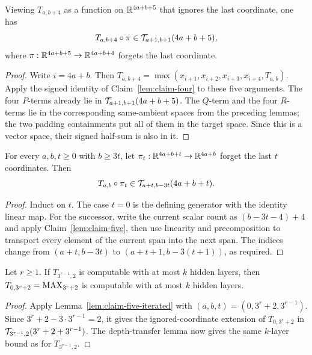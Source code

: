 \begin{lemma}
  \label{lem:claim-five}
  Viewing $T_{a,b+4}$ as a function on $\mathbb{R}^{4a+b+5}$ that ignores the last
  coordinate, one has
  \[
    T_{a,b+4}\circ\pi\in\mathcal{T}_{a+1,b+1}(4a+b+5),
  \]
  where $\pi:\mathbb{R}^{4a+b+5}\to\mathbb{R}^{4a+b+4}$ forgets the last coordinate.
\end{lemma}
\begin{proof}
  Write $i=4a+b$.  Then
  $T_{a,b+4}=\max(x_{i+1},x_{i+2},x_{i+3},x_{i+4},T_{a,b})$.
  Apply the signed identity of Claim~\ref{lem:claim-four} to these five
  arguments.  The four $P$-terms already lie in
  $\mathcal{T}_{a+1,b+1}(4a+b+5)$.  The $Q$-term and the four $R$-terms lie in the
  corresponding same-ambient spaces from the preceding lemmas; the two
  padding containments put all of them in the target space.  Since this is a
  vector space, their signed half-sum is
  also in it.
\end{proof}

\begin{lemma}
  \label{lem:claim-five-iterated}
  For every $a,b,t\geq0$ with $b\geq3t$, let
  $\pi_t:\mathbb{R}^{4a+b+t}\to\mathbb{R}^{4a+b}$ forget the last $t$ coordinates.  Then
  \[
    T_{a,b}\circ\pi_t\in\mathcal{T}_{a+t,b-3t}(4a+b+t).
  \]
\end{lemma}
\begin{proof}
  Induct on $t$.  The case $t=0$ is the defining generator with the identity
  linear map.  For the successor, write the current scalar count as
  $(b-3t-4)+4$ and apply Claim~\ref{lem:claim-five}, then use linearity and
  precomposition to transport every element of the current span into the next
  span.  The indices change from $(a+t,b-3t)$ to
  $(a+t+1,b-3(t+1))$, as required.
\end{proof}

\begin{lemma}
  \label{lem:claim-six}
  Let $r\geq1$.  If $T_{3^{r-1},2}$ is computable with at most $k$ hidden
  layers, then $T_{0,3^r+2}=\operatorname{MAX}_{3^r+2}$ is computable with at most $k$
  hidden layers.
\end{lemma}
\begin{proof}
  Apply Lemma~\ref{lem:claim-five-iterated} with
  $(a,b,t)=(0,3^r+2,3^{r-1})$.  Since
  $3^r+2-3\cdot3^{r-1}=2$, it gives
  the ignored-coordinate extension of $T_{0,3^r+2}$ in
  $\mathcal{T}_{3^{r-1},2}(3^r+2+3^{r-1})$.  The depth-transfer lemma now gives
  the same $k$-layer bound as for $T_{3^{r-1},2}$.
\end{proof}

